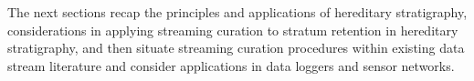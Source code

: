 The next sections recap the principles and applications of hereditary stratigraphy, considerations in applying streaming curation to stratum retention in hereditary stratigraphy, and then situate streaming curation procedures within existing data stream literature and consider applications in data loggers and sensor networks.
